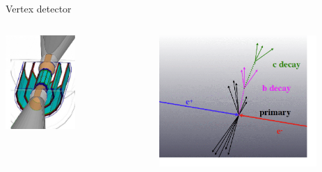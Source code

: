 \documentclass{beamer}
\begin{document}
\begin{frame}[label=vxd]
    \vspace{-0.3cm}
    \begin{block}{Vertex detector}
      \vspace{-0.2cm}
      \begin{columns}[c]
        \begin{column}{5cm}
          \begin{center}
            \includegraphics[width = 0.5\textwidth]{Pictures/ild_vxd_3layers.jpg}
          \end{center}
        \end{column}
        \begin{column}{5cm}
          \begin{center}
            \includegraphics[width = 0.8\textwidth]{Pictures/schematicFlavourVertices.png}
          \end{center}
        \end{column}
      \end{columns}
    \end{block}


\end{frame}
\end{document}
